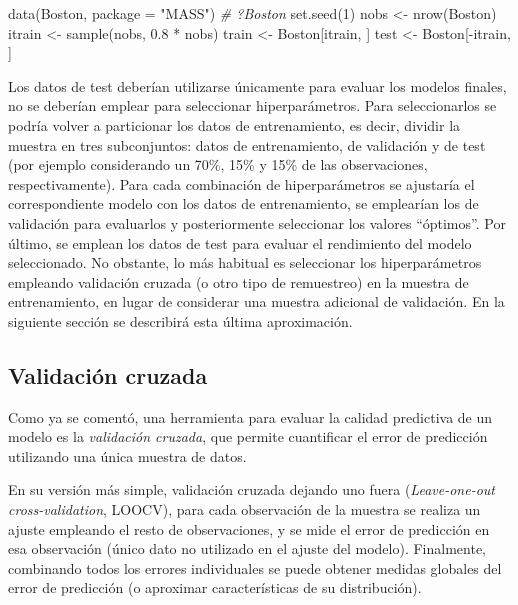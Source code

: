 \documentclass[
  spanish,
]{book}
\newenvironment{Shaded}{\begin{snugshade}}{\end{snugshade}}
\newcommand{\AttributeTok}[1]{\textcolor[rgb]{0.77,0.63,0.00}{#1}}
\newcommand{\CommentTok}[1]{\textcolor[rgb]{0.56,0.35,0.01}{\textit{#1}}}
\newcommand{\DecValTok}[1]{\textcolor[rgb]{0.00,0.00,0.81}{#1}}
\newcommand{\FloatTok}[1]{\textcolor[rgb]{0.00,0.00,0.81}{#1}}
\newcommand{\FunctionTok}[1]{\textcolor[rgb]{0.00,0.00,0.00}{#1}}
\newcommand{\NormalTok}[1]{#1}
\newcommand{\OtherTok}[1]{\textcolor[rgb]{0.56,0.35,0.01}{#1}}
\newcommand{\SpecialCharTok}[1]{\textcolor[rgb]{0.00,0.00,0.00}{#1}}
\newcommand{\StringTok}[1]{\textcolor[rgb]{0.31,0.60,0.02}{#1}}
\theoremstyle{break}
\theoremstyle{definition}
\theoremstyle{definition}
\theoremstyle{definition}
\theoremstyle{definition}
\theoremstyle{remark}
\begin{document}
\begin{Shaded}
\begin{Highlighting}[]
\FunctionTok{data}\NormalTok{(Boston, }\AttributeTok{package =} \StringTok{"MASS"}\NormalTok{)}
\CommentTok{\# ?Boston}
\FunctionTok{set.seed}\NormalTok{(}\DecValTok{1}\NormalTok{)}
\NormalTok{nobs }\OtherTok{\textless{}{-}} \FunctionTok{nrow}\NormalTok{(Boston)}
\NormalTok{itrain }\OtherTok{\textless{}{-}} \FunctionTok{sample}\NormalTok{(nobs, }\FloatTok{0.8} \SpecialCharTok{*}\NormalTok{ nobs)}
\NormalTok{train }\OtherTok{\textless{}{-}}\NormalTok{ Boston[itrain, ]}
\NormalTok{test }\OtherTok{\textless{}{-}}\NormalTok{ Boston[}\SpecialCharTok{{-}}\NormalTok{itrain, ]}
\end{Highlighting}
\end{Shaded}

Los datos de test deberían utilizarse únicamente para evaluar los modelos finales, no se deberían emplear para seleccionar hiperparámetros.
Para seleccionarlos se podría volver a particionar los datos de entrenamiento, es decir, dividir la muestra en tres subconjuntos: datos de entrenamiento, de validación y de test (por ejemplo considerando un 70\%, 15\% y 15\% de las observaciones, respectivamente).
Para cada combinación de hiperparámetros se ajustaría el correspondiente modelo con los datos de entrenamiento, se emplearían los de validación para evaluarlos y posteriormente seleccionar los valores ``óptimos''. Por último, se emplean los datos de test para evaluar el rendimiento del modelo seleccionado.
No obstante, lo más habitual es seleccionar los hiperparámetros empleando validación cruzada (o otro tipo de remuestreo) en la muestra de entrenamiento, en lugar de considerar una muestra adicional de validación.
En la siguiente sección se describirá esta última aproximación.

\hypertarget{cv}{%
\subsection{Validación cruzada}\label{cv}}

Como ya se comentó, una herramienta para evaluar la calidad predictiva de un modelo es la \emph{validación cruzada}, que permite cuantificar el error de predicción utilizando una única muestra de datos.

En su versión más simple, validación cruzada dejando uno fuera (\emph{Leave-one-out cross-validation}, LOOCV), para cada observación de la muestra se realiza un ajuste empleando el resto de observaciones, y se mide el error de predicción en esa observación (único dato no utilizado en el ajuste del modelo).
Finalmente, combinando todos los errores individuales se puede obtener medidas globales del error de predicción (o aproximar características de su distribución).
\end{document}
